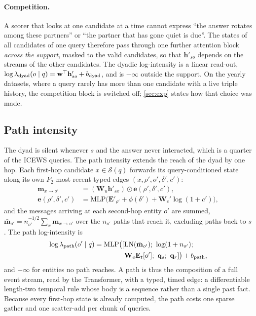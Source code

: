 \paragraph{Competition.}
A scorer that looks at one candidate at a time cannot express ``the answer rotates among these partners'' or ``the partner that has gone quiet is due''. The states of all candidates of one query therefore pass through one further attention block \emph{across the support}, masked to the valid candidates, so that $\mathbf{h}'_{so}$ depends on the streams of the other candidates. The dyadic log-intensity is a linear read-out, $\log\lambda_{\text{dyad}}(o \mid q) = \mathbf{w}^\top \mathbf{h}'_{so} + b_{\text{dyad}}$, and is $-\infty$ outside the support. On the yearly datasets, where a query rarely has more than one candidate with a live triple history, the competition block is switched off; \cref{sec:exp} states how that choice was made.

\subsection{Path intensity}

The dyad is silent whenever $s$ and the answer never interacted, which is a quarter of the ICEWS queries. The path intensity extends the reach of the dyad by one hop. Each first-hop candidate $x \in \mathcal{S}(q)$ forwards its query-conditioned state along its own $P_2$ most recent typed edges $(x, \rho', o', \delta', c')$:
\begin{equation}
  \begin{aligned}
  \mathbf{m}_{x \to o'} &= (\mathbf{W}_u \mathbf{h}'_{sx}) \odot \mathbf{e}(\rho', \delta', c'),\\
  \mathbf{e}(\rho', \delta', c') &= \mathrm{MLP}\big(\mathbf{E}'_{\rho'} + \phi(\delta') + \mathbf{W}_c' \log(1+c')\big),
  \end{aligned}
\end{equation}
and the messages arriving at each second-hop entity $o'$ are summed, $\bar{\mathbf{m}}_{o'} = n_{o'}^{-1/2} \sum_x \mathbf{m}_{x \to o'}$ over the $n_{o'}$ paths that reach it, excluding paths back to $s$. The path log-intensity is
\begin{equation}
  \begin{aligned}
  \log\lam_{\text{path}}(o' \mid q) = \mathrm{MLP}\big([&\mathrm{LN}(\bar{\mathbf{m}}_{o'});\ \log(1+n_{o'});\\
                                                        &\mathbf{W}_e \mathbf{E}_t[o'];\ \mathbf{q}_s;\ \mathbf{q}_r]\big) + b_{\text{path}},
  \end{aligned}
\end{equation}
and $-\infty$ for entities no path reaches. A path is thus the composition of a full event stream, read by the Transformer, with a typed, timed edge: a differentiable length-two temporal rule whose body is a sequence rather than a single past fact. Because every first-hop state is already computed, the path costs one sparse gather and one scatter-add per chunk of queries.

